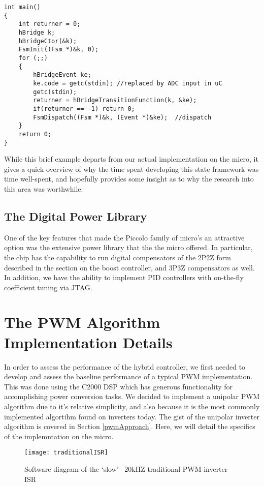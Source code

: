 \begin{lstlisting}
int main()
{
    int returner = 0;
    hBridge k;
    hBridgeCtor(&k);
    FsmInit((Fsm *)&k, 0);
    for (;;)
    {
        hBridgeEvent ke;                   
        ke.code = getc(stdin); //replaced by ADC input in uC           
        getc(stdin);                      
        returner = hBridgeTransitionFunction(k, &ke);
        if(returner == -1) return 0;
        FsmDispatch((Fsm *)&k, (Event *)&ke);  //dispatch
    }
    return 0;
}
\end{lstlisting}
\hfill \break
\hfill \break
 
While this brief example departs from our actual implementation on the micro, it gives a quick overview of why the time spent developing this state framework was time well-spent, and hopefully provides some insight as to why the research into this area was worthwhile.

\subsection{The Digital Power Library}
One of the key features that made the Piccolo family of micro's an attractive option was the extensive power library that the the micro offered. In particular, the chip has the capability to run digital compensators of the 2P2Z form described in the section on the boost controller, and 3P3Z compensators as well. In addition, we have the ability to implement PID controllers with on-the-fly coefficient tuning via JTAG.

\section{The PWM Algorithm Implementation Details}
In order to assess the performance of the hybrid controller, we first needed to develop and assess the baseline performance of a typical PWM implementation. This was done using the C2000 DSP which has generous functionality for accomplishing power conversion tasks. We decided to implement a unipolar PWM algorithm due to it's relative simplicity, and also because it is the most commonly implemented algortihm found on inverters today. The gist of the unipolar inverter algorithm is covered in Section \ref{pwmApproach}. Here, we will detail the specifics of the implemntation on the micro.

\begin{figure}[h]
\begin{center}
\texttt{[image: traditionalISR]}
\caption{Software diagram of the `slow' ~20kHZ traditional PWM inverter ISR}
\label{slow}
\end{center}
\end{figure}

